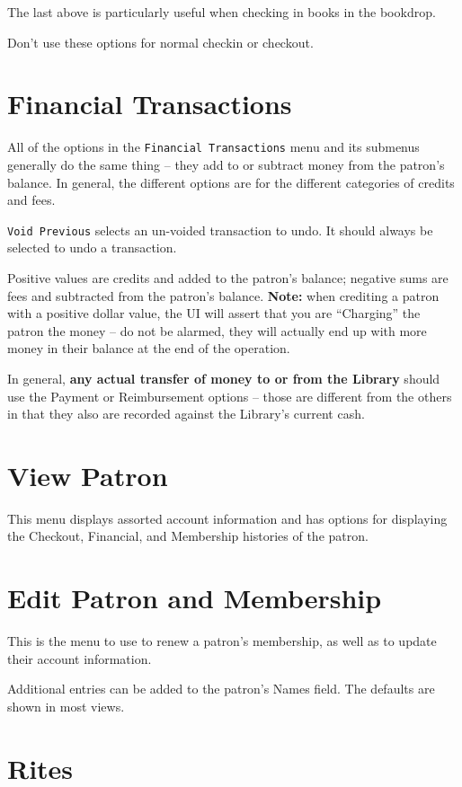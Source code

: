 \documentclass[12pt]{article}
\begin{document}
The last above is particularly useful when checking in books in the
bookdrop.

Don't use these options for normal checkin or checkout.

\section{Financial Transactions}

All of the options in the \texttt{Financial Transactions} menu and its
submenus generally do the same thing -- they add to or subtract money
from the patron's balance.  In general, the different options are for
the different categories of credits and fees.

\texttt{Void Previous} selects an un-voided transaction to undo. It
should always be selected to undo a transaction.

Positive values are credits and added to the patron's balance; negative
sums are fees and subtracted from the patron's balance.  \textbf{Note:}
when crediting a patron with a positive dollar value, the UI will assert
that you are ``Charging'' the patron the money -- do not be alarmed, they
will actually end up with more money in their balance at the end of the
operation.

In general, \textbf{any actual transfer of money to or from the Library}
should use the Payment or Reimbursement options -- those are different
from the others in that they also are recorded against the Library's
current cash.


\section{View Patron}

This menu displays assorted account information and has options for
displaying the Checkout, Financial, and Membership histories of the
patron.

\section{Edit Patron and Membership}

This is the menu to use to renew a patron's membership, as well as to
update their account information.

Additional entries can be added to the patron's Names field. The
defaults are shown in most views.

\section{Rites}
\end{document}
